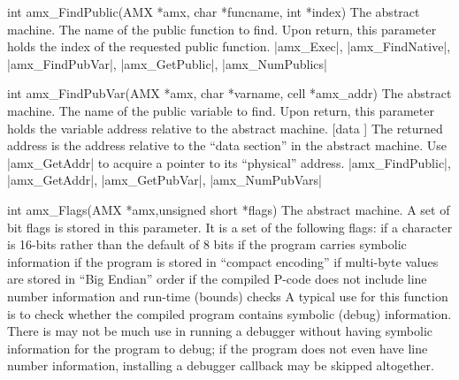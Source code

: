 \syntaxp int amx_FindPublic(AMX *amx, char *funcname, int *index)
        The abstract machine.
        The name of the public function to find.
        Upon return, this parameter holds the index of the requested public
        function.
\seealso
    |amx_Exec|, |amx_FindNative|, |amx_FindPubVar|, |amx_GetPublic|, |amx_NumPublics|

\goodbreak
\syntaxp int amx_FindPubVar(AMX *amx, char *varname, \lbreak
                            cell *amx_addr)
        The abstract machine.
        The name of the public variable to find.
        Upon return, this parameter holds the variable address relative to
        the abstract machine.
\notes
     [data \midtilde]
    The returned address is the address relative to the ``data section''
    in the abstract machine. Use |amx_GetAddr| to acquire a pointer to its
    ``physical'' address.
\seealso
    |amx_FindPublic|, |amx_GetAddr|, |amx_GetPubVar|, |amx_NumPubVars|

\syntaxp int amx_Flags(AMX *amx,unsigned short *flags)
        The abstract machine.
        A set of bit flags is stored in this parameter. It is a set of the
        following flags:
        \beginlist{80pt}\compactlist
            if a character is 16-bits rather than the default of 8 bits
            if the program carries symbolic information
            if the program is stored in ``compact encoding''
            if multi-byte values are stored in ``Big Endian'' order
            if the compiled P-code does {\it\/} not include
            line number information and run-time (bounds) checks
        \endlist
\notes
    A typical use for this function is to check whether the compiled program
    contains symbolic (debug) information. There is may not be much use in
    running a debugger without having symbolic information for the program to
    debug; if the program does not even have line number information, installing
    a debugger callback may be skipped altogether.

